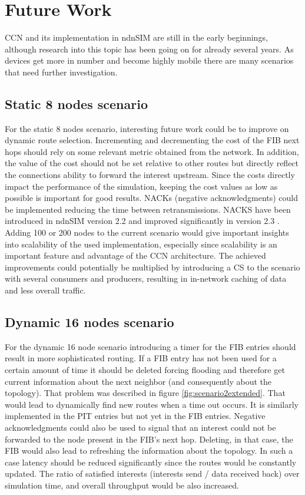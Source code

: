 \section{Future Work}

CCN and its implementation in ndnSIM are still in the early beginnings, although research into this topic has been going on for already several years. As devices get more in number and become highly mobile there are many scenarios that need further investigation.

\subsection{Static 8 nodes scenario}

For the static 8 nodes scenario, interesting future work could be to improve on dynamic route selection. Incrementing and decrementing the cost of the FIB next hops should rely on some relevant metric obtained from the network. In addition, the value of the cost should not be set relative to other routes but directly reflect the connections ability to forward the interest upstream. Since the costs directly impact the performance of the simulation, keeping the cost values as low as possible is important for good results. NACKs (negative acknowledgments) could be implemented reducing the time between retransmissions. NACKS have been introduced in ndnSIM version 2.2 and improved significantly in version 2.3 \cite{ndnSIMreleaseNotes}. Adding 100 or 200 nodes to the current scenario would give important insights into scalability of the used implementation, especially since scalability is an important feature and advantage of the CCN architecture. The achieved improvements could potentially be multiplied by introducing a CS to the scenario with several consumers and producers, resulting in in-network caching of data and less overall traffic.

\subsection{Dynamic 16 nodes scenario}

For the dynamic 16 node scenario introducing a timer for the FIB entries should result in more sophisticated routing. If a FIB entry has not been used for a certain amount of time it should be deleted forcing flooding and therefore get current information about the next neighbor (and consequently about the topology). That problem was described in figure \ref{fig:scenario2extended}. That would lead to dynamically find new routes when a time out occurs. It is similarly implemented in the PIT entries but not yet in the FIB entries. Negative acknowledgments could also be used to signal that an interest could not be forwarded to the node present in the FIB's next hop. Deleting, in that case, the FIB would also lead to refreshing the information about the topology. In such a case latency should be reduced significantly since the routes would be constantly updated. The ratio of satisfied interests (interests send / data received back) over simulation time, and overall throughput would be also increased.






